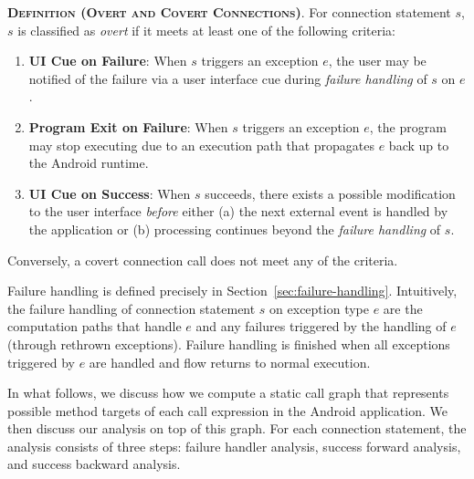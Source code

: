 \begin{description}[leftmargin=0cm,listparindent=0pt,itemindent=0cm]
\item \textsc{\bfseries{Definition (Overt and Covert
    Connections)}}.  For connection statement $s$, $s$ is classified as
   {\it overt} if it meets at least one of the following
  criteria:
  
\begin{enumerate}
\item  {\bf UI Cue on Failure}: When $s$ triggers an
  exception $e$,
  the user may be notified of the failure via a user interface cue
  during {\it failure handling} of $s$ on $e$.


\item {\bf Program Exit on Failure}: When $s$ triggers an exception $e$, the
program may stop executing due to an execution path that propagates
$e$ back up to the Android runtime.

\item {\bf UI Cue on Success}: When $s$ succeeds, there
  exists a possible modification to the user interface {\it before}
  either (a) the next external event is handled by the application or
  (b) processing continues beyond the {\it failure handling} of $s$.

\end{enumerate}

\noindent Conversely, a covert connection call does not meet any of
the criteria.  

\end{description}

Failure handling is defined precisely in
Section~\ref{sec:failure-handling}.  Intuitively, the failure handling
of connection statement $s$ on exception type $e$ are the computation
paths that handle $e$ and any failures triggered by the handling of
$e$ (through rethrown exceptions).  Failure handling is finished when
all exceptions triggered by $e$ are handled and flow returns to normal
execution.  

In what follows, we discuss how we compute a static call graph
that represents possible method targets of each call expression in the
Android application. We then discuss our analysis on top of this graph. 
For each connection statement, the analysis consists of three steps:
failure handler analysis, success forward analysis,
and success backward analysis. 

